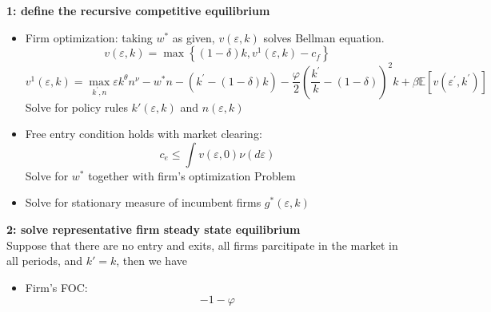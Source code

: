 \documentclass[12pt]{article}
\begin{document}
\textbf{1: define the recursive competitive equilibrium}
  \begin{itemize}
    \item Firm optimization: taking $w^*$ as given, $v(\varepsilon, k)$ solves Bellman equation.
    $$v(\varepsilon, k)=\max \left\{(1-\delta) k, v^{1}(\varepsilon, k)-c_{f}\right\}$$
    $$v^{1}(\varepsilon, k)=\max _{k^{\prime}, n} \varepsilon k^{\theta} n^{\nu}-w^{*} n-\left(k^{\prime}-(1-\delta) k\right)-\frac{\varphi}{2}\left(\frac{k^{\prime}}{k}-(1-\delta)\right)^{2} k+\beta \mathbb{E}\left[v\left(\varepsilon^{\prime}, k^{\prime}\right)\right]$$
    Solve for policy rules $k'(\varepsilon, k)$ and $n(\varepsilon, k)$
    \item Free entry condition holds with market clearing:
    $$c_{e} \leq \int v(\varepsilon, 0) \nu(d \varepsilon)$$
    Solve for $w^*$ together with firm's optimization Problem
    \item Solve for stationary measure of incumbent firms $g^*(\varepsilon, k)$
  \end{itemize}

\textbf{2: solve representative firm steady state equilibrium}\\
Suppose that there are no entry and exits, all firms parcitipate in the market in all periods, and $k' = k$,  then we have
  \begin{itemize}
    \item Firm's FOC:
    $$-1 - \varphi $$
  \end{itemize}


\end{document}
